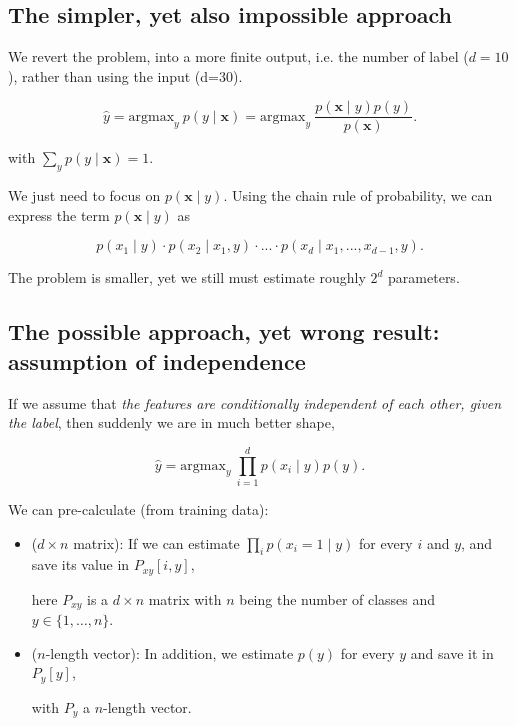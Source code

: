 \subsection{The simpler, yet also impossible approach}

We revert the problem, into a more finite output, i.e. the number of label
($d=10$), rather than using the input (d=30).


$$\hat{y} = \mathrm{argmax}_y \> p(y  \mid  \mathbf{x}) = \mathrm{argmax}_y \> \frac{p( \mathbf{x}  \mid  y) p(y)}{p(\mathbf{x})}.$$

with  $\sum_y p(y  \mid  \mathbf{x}) = 1$.

We just need to focus on  $p( \mathbf{x}  \mid  y)$. 
Using the chain rule of probability, we can express the term $p( \mathbf{x}  \mid  y)$ as

$$p(x_1  \mid y) \cdot p(x_2  \mid  x_1, y) \cdot ... \cdot p( x_d  \mid  x_1, ..., x_{d-1}, y).$$

The problem is smaller, yet  we still must estimate roughly $2^d$ parameters.

\subsection{The possible approach, yet wrong result: assumption of independence}

If we assume that {\it the features are conditionally independent of each other,
given the label}, then suddenly we are in much better shape,

\begin{equation}
\hat{y} = \mathrm{argmax}_y \> \prod_{i=1}^d p(x_i  \mid  y) p(y).
\end{equation}

We can pre-calculate (from training data): 

\begin{itemize}
  
  \item ($d\times n$ matrix):
  If we can estimate $\prod_i p(x_i=1  \mid  y)$ for every
$i$ and $y$, and save its value in $P_{xy}[i, y]$, 

here $P_{xy}$ is a $d \times n$ matrix with $n$ being the number of classes and
$y\in\{1, \ldots, n\}$.

  \item  ($n$-length vector): In addition, we estimate $p(y)$ for every $y$ and save it in $P_y[y]$, 
  
  with $P_y$ a $n$-length vector.
\end{itemize}

